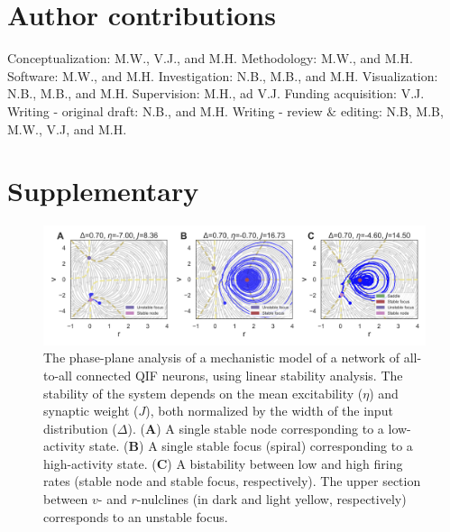 \documentclass[preprint,11pt,authoryear]{elsarticle}
\begin{document}
\section*{Author contributions}

Conceptualization: M.W., V.J., and M.H. Methodology: M.W., and M.H.  Software: M.W., and M.H.  Investigation: N.B.,  M.B., and M.H. Visualization: N.B.,  M.B., and M.H. Supervision:  M.H., ad V.J. Funding acquisition: V.J. Writing - original draft: N.B., and M.H. Writing - review $\&$ editing: N.B, M.B,  M.W., V.J, and M.H.





\clearpage   

\setcounter{figure}{0}

\section{Supplementary}


\begin{figure}[ht]
    \centering
    \includegraphics[width=\linewidth]{Figs/FigS1.png}
    \renewcommand{\thefigure}{S\arabic{figure}}
    \caption{The phase-plane analysis of a mechanistic model of a network of all-to-all connected QIF neurons, using linear stability analysis. The stability of the system depends on the mean excitability ($\eta$) and synaptic weight ($J$), both normalized by the width of the input distribution ($\Delta$). (\textbf{A}) A single stable node corresponding to a low-activity state. (\textbf{B}) A single stable focus (spiral) corresponding to a high-activity state. (\textbf{C}) A bistability between low and high firing rates (stable node and stable focus, respectively). The upper section between $v$- and $r$-nulclines (in dark and light yellow, respectively) corresponds to an unstable focus. }
    \label{fig:MPR_Istep_phaseplanes}
\end{figure}
\end{document}

